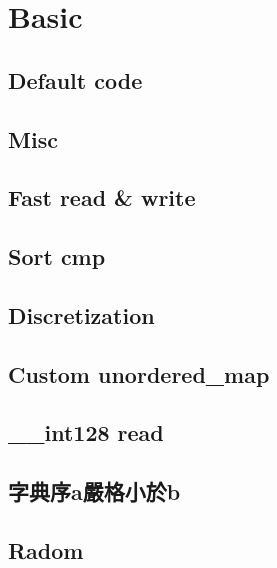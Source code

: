 
\section{Basic}

\subsection{Default code}


\subsection{Misc}


\subsection{Fast read \& write}


\subsection{Sort cmp}


\subsection{Discretization}


\subsection{Custom unordered\_map}


\subsection{\_\_int128 read}


\subsection{字典序a嚴格小於b}


\subsection{Radom}


